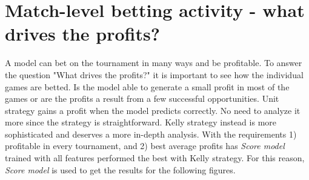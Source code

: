 \section{Match-level betting activity - what drives the profits?}
A model can bet on the tournament in many ways and be profitable. To answer the question "What drives the profits?" it is important to see how the individual games are betted. Is the model able to generate a small profit in most of the games or are the profits a result from a few successful opportunities. Unit strategy gains a profit when the model predicts correctly. No need to analyze it more since the strategy is straightforward. Kelly strategy instead is more sophisticated and deserves a more in-depth analysis. With the requirements 1) profitable in every tournament, and 2) best average profits has \textit{Score model} trained with all features performed the best with Kelly strategy. For this reason, \textit{Score model} is used to get the results for the following figures.

